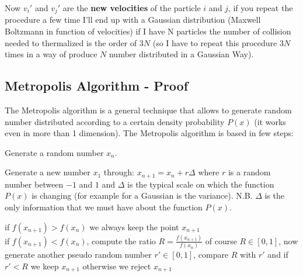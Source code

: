 Now $v_{i}'$ and $v_{j}'$ are the \textbf{new velocities} of the particle $i$ and $j$, if you repeat the procedure a few time I'll end up with a Gaussian distribution (Maxwell Boltzmann in function of velocities)
if I have N particles the number of collision needed to thermalized is the order of $3N$ (so I have to repeat this procedure $3N$ times in a way of produce $N$ number distributed in a Gaussian Way).


\subsection{Metropolis Algorithm - Proof} 
The Metropolis algorithm is a general technique that allows to generate random number distributed according to a certain density probability $P(x)$ (it works even in more than 1 dimension). The Metropolis algorithm is based in few steps:

\setcounter{elenco}{0}
\begin{list}{}{\setlength{\itemsep}{0.5cm}}
\item Generate a random number $x_n$.
\item Generate a new number $x_1$ through: $x_{n+1} = x_n + r \Delta$ where $r$ is a random number between $-1$ and $1$ and $\Delta$ is the typical scale on which the function $P(x)$ is changing (for example for a Gaussian is the variance).
N.B. $\Delta$ is the only information that we must have about the function $P(x)$. 
\item if $ f(x_{n+1}) > f(x_{n}) $ we always keep the point $x_{n+1}$\\
    if $ f(x_{n+1}) < f(x_{n}) $, compute the ratio $ R = \frac{f(x_{n+1})}{f(x_n)} $ of course $R \in \left[ 0,1 \right]$, now generate another pseudo random number $r' \in \left[ 0,1 \right]$, compare $R$ with $r'$  and if $ r'< R$ we keep $ x_{n+1} $ otherwise we reject $x_{n+1}$
\end{list}

